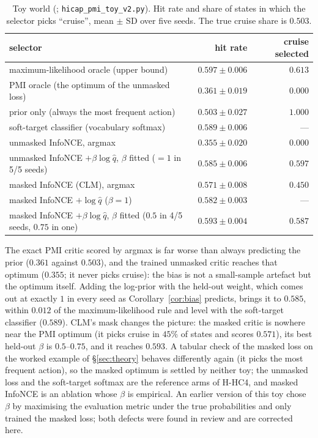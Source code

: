 \begin{table}[h]
\centering\small
\caption{Toy world (\evM; \texttt{hicap\_pmi\_toy\_v2.py}). Hit rate and share of states in which the selector picks ``cruise'', mean $\pm$ SD over five seeds. The true cruise share is $0.503$.}
\label{tab:pmi}
\begin{tabular}{@{}lrr@{}}
\toprule
selector & hit rate & cruise selected \\ \midrule
maximum-likelihood oracle (upper bound) & $0.597\pm0.006$ & $0.613$ \\
PMI oracle (the optimum of the unmasked loss) & $0.361\pm0.019$ & $0.000$ \\
prior only (always the most frequent action) & $0.503\pm0.027$ & $1.000$ \\
soft-target classifier (vocabulary softmax) & $0.589\pm0.006$ & --- \\
\midrule
unmasked InfoNCE, argmax & $0.355\pm0.020$ & $0.000$ \\
unmasked InfoNCE $+\beta\log\hat q$, $\beta$ fitted ($=1$ in 5/5 seeds) & $0.585\pm0.006$ & $0.597$ \\
masked InfoNCE (CLM), argmax & $0.571\pm0.008$ & $0.450$ \\
masked InfoNCE $+\log\hat q$ ($\beta=1$) & $0.582\pm0.003$ & --- \\
masked InfoNCE $+\beta\log\hat q$, $\beta$ fitted ($0.5$ in 4/5 seeds, $0.75$ in one) & $0.593\pm0.004$ & $0.587$ \\
\bottomrule
\end{tabular}
\end{table}
The exact PMI critic scored by argmax is far worse than always predicting the prior ($0.361$ against $0.503$), and the trained unmasked critic reaches that optimum ($0.355$; it never picks cruise): the bias is not a small-sample artefact but the optimum itself. Adding the log-prior with the held-out weight, which comes out at exactly $1$ in every seed as Corollary~\ref{cor:bias} predicts, brings it to $0.585$, within $0.012$ of the maximum-likelihood rule and level with the soft-target classifier ($0.589$).
CLM's mask changes the picture: the masked critic is nowhere near the PMI optimum (it picks cruise in $45\%$ of states and scores $0.571$), its best held-out $\beta$ is $0.5$--$0.75$, and it reaches $0.593$. A tabular check of the masked loss on the worked example of \S\ref{sec:theory} behaves differently again (it picks the most frequent action), so the masked optimum is settled by neither toy; the unmasked loss and the soft-target softmax are the reference arms of H-HC4, and masked InfoNCE is an ablation whose $\beta$ is empirical. An earlier version of this toy chose $\beta$ by maximising the evaluation metric under the true probabilities and only trained the masked loss; both defects were found in review and are corrected here.

